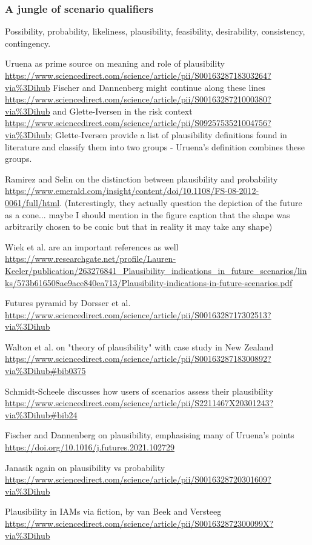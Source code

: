 \documentclass{article}
\begin{document}
\begin{refsection}
\subsubsection{A jungle of scenario qualifiers}
Possibility, probability, likeliness, plausibility, feasibility, desirability, consistency, contingency.

Uruena as prime source on meaning and role of plausibility \url{https://www.sciencedirect.com/science/article/pii/S0016328718303264?via%3Dihub} Fischer and Dannenberg might continue along these lines \url{https://www.sciencedirect.com/science/article/pii/S0016328721000380?via%3Dihub} and Glette-Iversen in the risk context \url{https://www.sciencedirect.com/science/article/pii/S0925753521004756?via%3Dihub}; Glette-Iversen provide a list of plausibility definitions found in literature and classify them into two groups - Uruena's definition combines these groups.

Ramirez and Selin on the distinction between plausibility and probability \url{https://www.emerald.com/insight/content/doi/10.1108/FS-08-2012-0061/full/html}. (Interestingly, they actually question the depiction of the future as a cone... maybe I should mention in the figure caption that the shape was arbitrarily chosen to be conic but that in reality it may take any shape)

Wiek et al. are an important references as well \url{https://www.researchgate.net/profile/Lauren-Keeler/publication/263276841_Plausibility_indications_in_future_scenarios/links/573b616508ae9ace840ea713/Plausibility-indications-in-future-scenarios.pdf}

Futures pyramid by Dorsser et al. \url{https://www.sciencedirect.com/science/article/pii/S0016328717302513?via%3Dihub}

Walton et al. on "theory of plausibility" with case study in New Zealand \url{https://www.sciencedirect.com/science/article/pii/S0016328718300892?via%3Dihub#bib0375}

Schmidt-Scheele discusses how users of scenarios assess their plausibility \url{https://www.sciencedirect.com/science/article/pii/S2211467X20301243?via%3Dihub#bib24}

Fischer and Dannenberg on plausibility, emphasising many of Uruena's points \url{https://doi.org/10.1016/j.futures.2021.102729}

Janasik again on plausibility vs probability \url{https://www.sciencedirect.com/science/article/pii/S0016328720301609?via%3Dihub}

Plausibility in IAMs via fiction, by van Beek and Versteeg \url{https://www.sciencedirect.com/science/article/pii/S001632872300099X?via%3Dihub}


\end{refsection}
\end{document}
